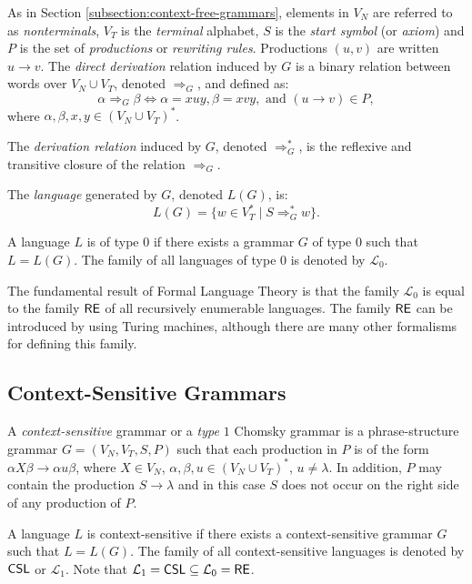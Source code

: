 As in Section \ref{subsection:context-free-grammars}, elements in $V_N$ are referred to as \emph{nonterminals}, $V_T$ is the  \emph{terminal} alphabet, $S$ is the \emph{start symbol} (or \emph{axiom}) and $P$ is the set of  \emph{productions} or \emph{rewriting rules}. Productions $(u, v)$ are written $u \to v$. The \emph{direct derivation} relation induced by $G$ is a binary relation between words over $V_N \cup V_T$, denoted $\Rightarrow_G$, and defined as:
$$\alpha \Rightarrow_G \beta \Leftrightarrow \alpha = xuy, \beta = xvy, \text{ and } (u \to v) \in P,$$
where $\alpha, \beta, x, y \in (V_N \cup V_T)^*$.

The \emph{derivation relation} induced by $G$, denoted $\Rightarrow^*_G$, is the reflexive and transitive closure of the relation $\Rightarrow_G$.

The \emph{language} generated by $G$, denoted $L(G)$, is:
$$L(G) = \{w \in V_T^* \mid S \Rightarrow^*_G w\}.$$

A language $L$ is of type $0$ if there exists a grammar $G$ of type $0$ such that $L = L(G)$. The family of all languages of type $0$ is denoted by $\mathcal{L}_0$.

The fundamental result of Formal Language Theory is that the family $\mathcal{L}_0$ is equal to the family \index{$\RE$}$\RE$ of all recursively enumerable languages. The family $\RE$ can be introduced by using Turing machines, although there are many other formalisms for defining this family.

\subsection{Context-Sensitive Grammars}
\label{subsection:context-sensitive-grammars}

A \emph{context-sensitive} grammar or a \emph{type $1$} Chomsky grammar is a phrase-structure grammar $G = (V_N, V_T, S, P)$ such that each production in $P$ is of the form $\alpha X \beta \to \alpha u \beta$, where $X \in V_N$, $\alpha, \beta, u \in (V_N \cup V_T)^*$, $u \neq \lambda$. In addition, $P$ may contain the production $S \to \lambda$ and in this case $S$ does not occur on the right side of any production of $P$.

A language $L$ is context-sensitive if there exists a context-sensitive grammar $G$ such that $L = L(G)$. The family of all context-sensitive languages is denoted by \index{$\CSL$}$\CSL$ or $\mathcal{L}_1$. Note that $\mathcal{L}_1 = \textup{\sf CSL} \subseteq \mathcal{L}_0 = \textup{\sf RE}$.

